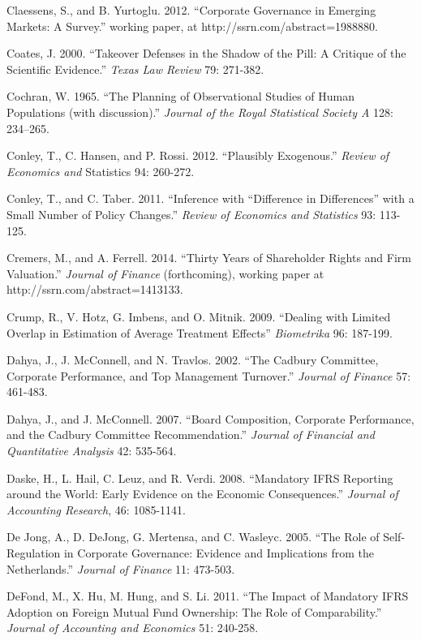 \noindent Claessens, S., and B. Yurtoglu. 2012. ``Corporate Governance in Emerging Markets:  A Survey.'' working paper, at http://ssrn.com/abstract=1988880.

\noindent Coates, J. 2000.  ``Takeover Defenses in the Shadow of the Pill:  A Critique of the Scientific Evidence.''  \textit{Texas Law Review} 79: 271-382.

\noindent Cochran, W. 1965. ``The Planning of Observational Studies of Human Populations (with discussion).''  \textit{Journal of the Royal Statistical Society A} 128: 234--265.

\noindent Conley, T., C. Hansen, and P. Rossi. 2012. ``Plausibly Exogenous.'' \textit{Review of Economics and }Statistics 94: 260-272. 

\noindent Conley, T., and C. Taber. 2011. ``Inference with ``Difference in Differences'' with a Small Number of Policy Changes.''  \textit{Review of Economics and Statistics} 93: 113-125.

\noindent Cremers, M., and A. Ferrell. 2014. ``Thirty Years of Shareholder Rights and Firm Valuation.'' \textit{Journal of Finance }(forthcoming), working paper at http://ssrn.com/abstract=1413133.

\noindent Crump, R., V. Hotz, G. Imbens, and O. Mitnik. 2009. ``Dealing with Limited Overlap in Estimation of Average Treatment Effects''  \textit{Biometrika} 96: 187-199.

\noindent Dahya, J., J. McConnell, and N. Travlos. 2002. ``The Cadbury Committee, Corporate Performance, and Top Management Turnover.'' \textit{Journal of Finance} 57: 461-483.

\noindent Dahya, J., and J. McConnell. 2007. ``Board Composition, Corporate Performance, and the Cadbury Committee Recommendation.'' \textit{Journal of Financial and Quantitative Analysis }42: 535-564.

\noindent Daske, H., L. Hail, C. Leuz, and R. Verdi. 2008. ``Mandatory IFRS Reporting around the World: Early Evidence on the Economic Consequences.'' \textit{Journal of Accounting Research}, 46: 1085-1141.

\noindent De Jong,  A., D. DeJong, G. Mertensa, and C. Wasleyc. 2005. ``The Role of Self-Regulation in Corporate Governance: Evidence and Implications from the Netherlands.'' \textit{Journal of Finance} 11: 473-503. 

\noindent DeFond, M., X. Hu, M. Hung, and S. Li. 2011. ``The Impact of Mandatory IFRS Adoption on Foreign Mutual Fund Ownership: The Role of Comparability.''  \textit{Journal of Accounting and Economics} 51: 240-258.

